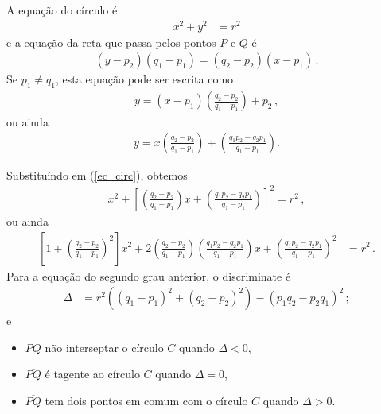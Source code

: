 A equação do círculo é
\begin{align}
    x^2 + y^2 &= r^2
    \label{ec_circ}
\end{align}
e a equação da reta que passa pelos pontos $P$ e $Q$ é
\begin{align*}
    (y-p_2)(q_1-p_1)=(q_2-p_2)(x-p_1)\,.
\end{align*}
Se $p_1\neq q_1$, esta equação pode ser escrita como
\begin{align*}
    y=(x-p_1)\left(\frac{q_2-p_2}{q_1-p_1}\right)+p_2\,,
\end{align*}
ou ainda
\begin{align*}
    y = x\left( \frac{q_2 - p_2}{q_1 - p_1} \right) + \left(
    \frac{q_1 p_2 - q_2 p_1}{q_1 - p_1} \right).
\end{align*}

Substituíndo em (\ref{ec_circ}), obtemos
\begin{align*}
    x^2  + \left[ \left( \frac{q_2 - p_2}{q_1 - p_1} \right) x + \left(
    \frac{q_1 p_2 - q_2 p_1}{q_1 - p_1} \right) \right]^2  = r^2\,,
\end{align*}
ou ainda
\begin{align*}
    \left[ 1 + \left( \frac{q_2 - p_2}{q_1 - p_1} \right)^2 \right] x^2 +
    2 \left( \frac{q_2 - p_2}{q_1 - p_1} \right) \left( \frac{q_1 p_2 - q_2
    p_1}{q_1 - p_1} \right) x + \left( 
    \frac{q_1 p_2 - q_2 p_1}{q_1 - p_1} \right)^2 & = r^2\,.
\end{align*}
Para a equação do segundo grau anterior, o discriminate é
\begin{align*}
    \Delta &= r^2 \left( \left( q_1 - p_1 \right)^2 + \left( q_2 - p_2
    \right)^2 \right) - \left( p_1 q_2 - p_2 q_1 \right)^2\,;
\end{align*}
e 
\begin{itemize}
    \item $\overline{PQ}$ não interseptar o círculo $C$ quando $\Delta < 0$,
    \item $\overline{PQ}$ é tagente ao círculo $C$ quando $\Delta = 0$,
    \item $\overline{PQ}$ tem dois pontos em comum com o círculo $C$ quando
        $\Delta > 0$.
\end{itemize}
